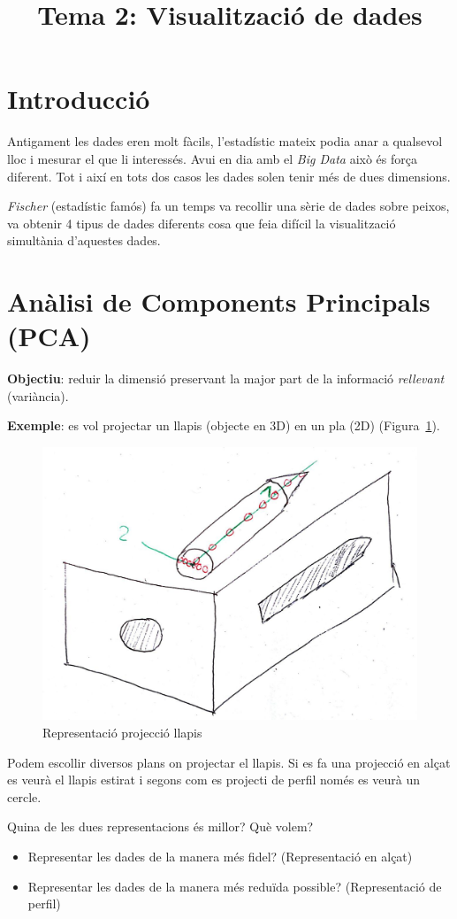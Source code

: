 \documentclass[a4paper]{article}
\begin{document}
	\title{Tema 2: Visualització de dades}
	\maketitle
	
	\section{Introducció}
	
	Antigament les dades eren molt fàcils, l'estadístic mateix podia anar a qualsevol lloc i mesurar el que li interessés. Avui en dia amb el \emph{Big Data} això és força diferent. Tot i així en tots dos casos les dades solen tenir més de dues dimensions. 
	
	\emph{Fischer} (estadístic famós) fa un temps va recollir una sèrie de dades sobre peixos, va obtenir 4 tipus de dades diferents cosa que feia difícil la visualització simultània d'aquestes dades.
	
	\section{Anàlisi de Components Principals (PCA)}
	
	\textbf{Objectiu}: reduir la dimensió preservant la major part de la informació \emph{rellevant} (variància). 
	
	\textbf{Exemple}: es vol projectar un llapis (objecte en 3D) en un pla (2D) (Figura~\ref{fig:llapis}).
	
	\begin{figure}[h!]
		\centering
		\includegraphics[width=0.5\linewidth]{llapis.jpg}
		\caption{Representació projecció llapis}
		\label{fig:llapis}
	\end{figure}
	
	Podem escollir diversos plans on projectar el llapis. Si es fa una projecció en alçat es veurà el llapis estirat i segons com es projecti de perfil només es veurà un cercle.
	
	Quina de les dues representacions és millor? Què volem? 
	\begin{itemize}
		\item Representar les dades de la manera més fidel? (Representació en alçat)
		\item Representar les dades de la manera més reduïda possible? (Representació de perfil)
	\end{itemize}
	
\end{document}
